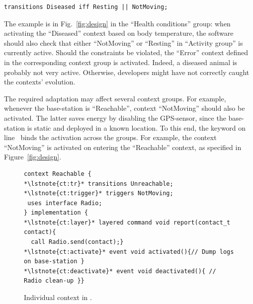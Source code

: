 \vspace{-1mm}
\begin{lstlisting}[language=conesc]
transitions Diseased iff Resting || NotMoving;
\end{lstlisting}
\vspace{-1.5mm}

The example is in Fig.~\ref{fig:design} in the ``Health conditions'' group: when
activating the ``Diseased'' context based on body temperature, the software
should also check that either ``NotMoving'' or ``Resting'' in ``Activity group''
is currently active. Should the constraints be violated, the ``Error'' context
defined in the corresponding context group is activated. Indeed, a diseased
animal is probably not very active. Otherwise, developers might have not
correctly caught the contexts' evolution.

The required adaptation may affect several context groups. For example, whenever
the base-station is ``Reachable'', context ``NotMoving'' should also be activated.
The latter saves energy by disabling the GPS-sensor, since the base-station is
static and deployed in a known location. To this end, the keyword
 on line~ binds the activation across the
groups. For example, the context ``NotMoving'' is activated on entering the
``Reachable'' context, as specified in Figure~\ref{fig:design}.


\begin{figure}[!tb]
\begin{lstlisting}[style=conescframe]
context Reachable {
*\lstnote{ct:tr}* transitions Unreachable;
*\lstnote{ct:trigger}* triggers NotMoving;
 uses interface Radio;
} implementation {
*\lstnote{ct:layer}* layered command void report(contact_t contact){
  call Radio.send(contact);}
*\lstnote{ct:activate}* event void activated(){// Dump logs on base-station }
*\lstnote{ct:deactivate}* event void deactivated(){ // Radio clean-up }}
\end{lstlisting}
\vspace{-3mm}
\caption{Individual context in \conesc.}
  \label{fig:context}
\vspace{-7mm}
\end{figure}
